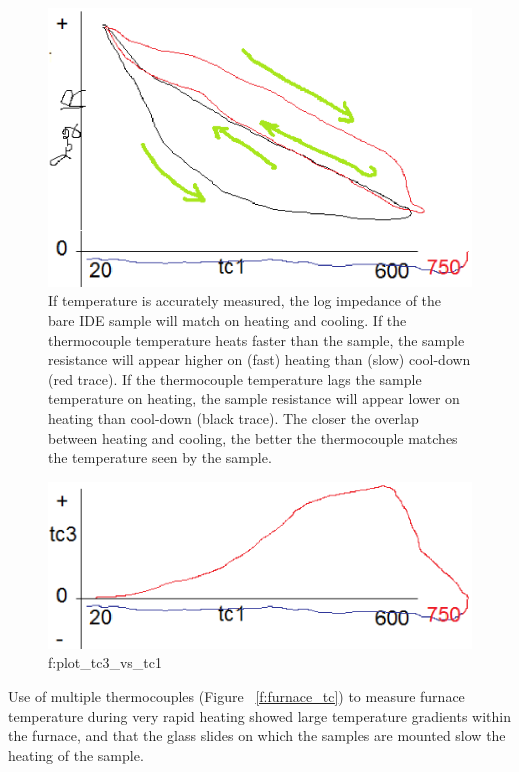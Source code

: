 \documentclass[12pt,oneside,english]{article}
\begin{document}
	\begin{figure}
		\includegraphics[width=150mm]{images/plot_logR_vs_tc1_and_tc3.eps}
		\caption{If temperature is accurately measured, the log impedance of the bare IDE sample will match on heating and cooling.  If the thermocouple temperature heats faster than the sample, the sample resistance will appear higher on (fast) heating than (slow) cool-down (red trace).  If the thermocouple temperature lags the sample temperature on heating, the sample resistance will appear lower on heating than cool-down (black trace).  The closer the overlap between heating and cooling, the better the thermocouple matches the temperature seen by the sample. }
		\label{f:logR_vs_t1_and_t3}
	\end{figure}
	
	\begin{figure}
		\includegraphics[width=150mm]{images/residual_plot_tc3_vs_tc1.eps}
		\caption{f:plot\_tc3\_vs\_tc1}
		\label{f:plot_tc3_vs_tc1}
	\end{figure}
	
	Use of multiple thermocouples (Figure ~\ref{f:furnace_tc}) to measure furnace temperature during very rapid heating showed large temperature gradients within the furnace, and that the glass slides on which the samples are mounted slow the heating of the sample.
\end{document}
